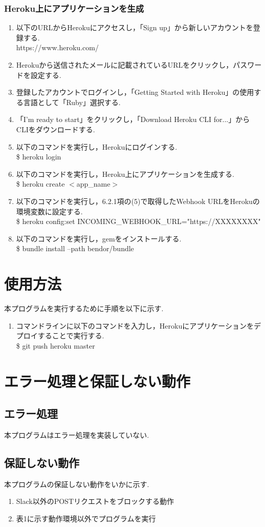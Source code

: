 \documentclass[fleqn, 14pt]{sty/extarticlej}
\begin{document}
\subsubsection{Heroku上にアプリケーションを生成}
\begin{enumerate}
\item 以下のURLからHerokuにアクセスし，「Sign up」から新しいアカウントを登録する.\\
  https://www.heroku.com/
\item Herokuから送信されたメールに記載されているURLをクリックし，パスワードを設定する.
\item 登録したアカウントでログインし，「Getting Started with Heroku」の使用する言語として「Ruby」選択する.
\item 「I'm ready to start」をクリックし，「Download Heroku CLI for...」からCLIをダウンロードする.
\item 以下のコマンドを実行し，Herokuにログインする.\\
  \$ heroku login
\item 以下のコマンドを実行し，Heroku上にアプリケーションを生成する.\\
  \$ heroku create $<$app\_name$>$
\item 以下のコマンドを実行し，6.2.1項の(5)で取得したWebhook URLをHerokuの環境変数に設定する.\\
  \$ heroku config:set INCOMING\_WEBHOOK\_URL="https://XXXXXXXX"
\item 以下のコマンドを実行し，gemをインストールする.\\
  \$ bundle install --path bendor/bundle
\end{enumerate}   
\section{使用方法}
本プログラムを実行するために手順を以下に示す.
\begin{enumerate}
\item コマンドラインに以下のコマンドを入力し，Herokuにアプリケーションをデプロイすることで実行する.\\
  \$ git push heroku master
\end{enumerate}
\section{エラー処理と保証しない動作}
\subsection{エラー処理}
本プログラムはエラー処理を実装していない.
\subsection{保証しない動作}
本プログラムの保証しない動作をいかに示す.
\begin{enumerate}
\item Slack以外のPOSTリクエストをブロックする動作
\item 表1に示す動作環境以外でプログラムを実行
\end{enumerate}





\end{document}
